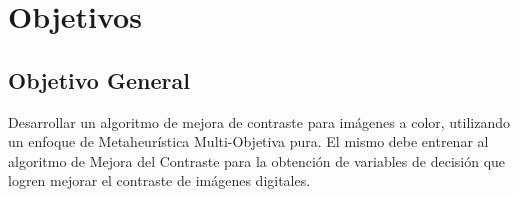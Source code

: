 


\section{Objetivos}
\subsection{Objetivo General}
Desarrollar un algoritmo de mejora de contraste para imágenes a color, utilizando un enfoque de Metaheurística Multi-Objetiva pura. El mismo debe entrenar al algoritmo de Mejora del Contraste para la obtención de variables de decisión que logren mejorar el contraste de imágenes digitales. 
